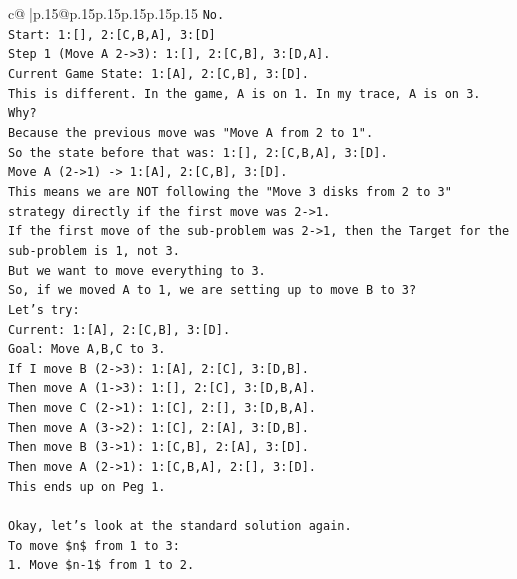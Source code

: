 \documentclass{article}
\begin{document}
{\begin{supertabular}{c@{$\;$}|p{.15\linewidth}@{}p{.15\linewidth}p{.15\linewidth}p{.15\linewidth}p{.15\linewidth}p{.15\linewidth}}
{{{\texttt{No.} \\
\texttt{Start: 1:{[}{]}, 2:{[}C,B,A{]}, 3:{[}D{]}} \\
\texttt{Step 1 (Move A 2{-}>3): 1:{[}{]}, 2:{[}C,B{]}, 3:{[}D,A{]}.} \\
\texttt{Current Game State: 1:{[}A{]}, 2:{[}C,B{]}, 3:{[}D{]}.} \\
\texttt{This is different. In the game, A is on 1. In my trace, A is on 3.} \\
\texttt{Why?} \\
\texttt{Because the previous move was "Move A from 2 to 1".} \\
\texttt{So the state before that was: 1:{[}{]}, 2:{[}C,B,A{]}, 3:{[}D{]}.} \\
\texttt{Move A (2{-}>1) {-}> 1:{[}A{]}, 2:{[}C,B{]}, 3:{[}D{]}.} \\
\texttt{This means we are NOT following the "Move 3 disks from 2 to 3" strategy directly if the first move was 2{-}>1.} \\
\texttt{If the first move of the sub{-}problem was 2{-}>1, then the Target for the sub{-}problem is 1, not 3.} \\
\texttt{But we want to move everything to 3.} \\
\texttt{So, if we moved A to 1, we are setting up to move B to 3?} \\
\texttt{Let's try:} \\
\texttt{Current: 1:{[}A{]}, 2:{[}C,B{]}, 3:{[}D{]}.} \\
\texttt{Goal: Move A,B,C to 3.} \\
\texttt{If I move B (2{-}>3): 1:{[}A{]}, 2:{[}C{]}, 3:{[}D,B{]}.} \\
\texttt{Then move A (1{-}>3): 1:{[}{]}, 2:{[}C{]}, 3:{[}D,B,A{]}.} \\
\texttt{Then move C (2{-}>1): 1:{[}C{]}, 2:{[}{]}, 3:{[}D,B,A{]}.} \\
\texttt{Then move A (3{-}>2): 1:{[}C{]}, 2:{[}A{]}, 3:{[}D,B{]}.} \\
\texttt{Then move B (3{-}>1): 1:{[}C,B{]}, 2:{[}A{]}, 3:{[}D{]}.} \\
\texttt{Then move A (2{-}>1): 1:{[}C,B,A{]}, 2:{[}{]}, 3:{[}D{]}.} \\
\texttt{This ends up on Peg 1.} \\
\\ 
\texttt{Okay, let's look at the standard solution again.} \\
\texttt{To move \$n\$ from 1 to 3:} \\
\texttt{1. Move \$n{-}1\$ from 1 to 2.} \\
}}}
\end{supertabular}}
\end{document}
